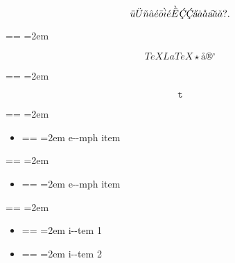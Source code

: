 \documentclass{book}
\makeatletter
\newenvironment{GNUTexinfopreformatted}{%
  \par\obeylines\obeyspaces\frenchspacing
  \parskip=\z@\parindent=\z@}{}
\makeatother
\begin{document}
$$
\ddot{u} \ddot{U} \tilde{n} \hat{a} \acute{e} \bar{o} \grave{i} \acute{e} \grave{\bar{E}}
\textsl{\c{\'{C}}} \textsl{\c{\'{C}}} \textsl{\H{a}} \dot{a} \mathring{a} \textsl{\t{a}}
\breve{a} \check{a}
 ? .
$$
\begin{GNUTexinfopreformatted}
\leftskip=2em\relax\ttfamily%

\end{GNUTexinfopreformatted}
$$
TeX LaTeX \star{} \mathord{\text{\aa{}}} \circledR{} ^{\circ{}} 
$$
\begin{GNUTexinfopreformatted}
\leftskip=2em\relax\ttfamily%

\end{GNUTexinfopreformatted}
$$
\mathtt{t} 
$$
\begin{GNUTexinfopreformatted}
\leftskip=2em\relax\ttfamily%

\end{GNUTexinfopreformatted}
\begin{itemize}[label=\emph{}]
\item \begin{GNUTexinfopreformatted}
\leftskip=2em\relax\ttfamily%
e{-}{-}mph item
\end{GNUTexinfopreformatted}
\end{itemize}
\begin{GNUTexinfopreformatted}
\leftskip=2em\relax\ttfamily%

\end{GNUTexinfopreformatted}
\begin{itemize}[label=\emph{} after emph]
\item \begin{GNUTexinfopreformatted}
\leftskip=2em\relax\ttfamily%
e{-}{-}mph item
\end{GNUTexinfopreformatted}
\end{itemize}
\begin{GNUTexinfopreformatted}
\leftskip=2em\relax\ttfamily%

\end{GNUTexinfopreformatted}
\begin{itemize}[label=\textbullet{} a--n itemize line]
\item \begin{GNUTexinfopreformatted}
\leftskip=2em\relax\ttfamily%
i{-}{-}tem 1
\end{GNUTexinfopreformatted}
\item \begin{GNUTexinfopreformatted}
\leftskip=2em\relax\ttfamily%
i{-}{-}tem 2
\end{GNUTexinfopreformatted}
\end{itemize}
\end{document}
